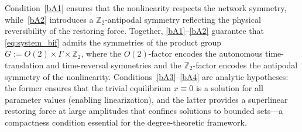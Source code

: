 \documentclass[twoside]{article}%
\def\bz{{\mathbb{Z}}}
\begin{document}
Condition~\ref{bA1} ensures that the nonlinearity respects the network symmetry, while~\ref{bA2} introduces a $\bz_2$-antipodal symmetry reflecting the physical reversibility of the restoring force.
Together, \ref{bA1}--\ref{bA2} guarantee that
\eqref{eq:system_bif} admits the symmetries of the product group $G := O(2) \times \Gamma \times \bz_2$, where the $O(2)$-factor encodes the autonomous time-translation and time-reversal symmetries and the $\bz_2$-factor encodes the antipodal symmetry of the nonlinearity.  Conditions~\ref{bA3}--\ref{bA4} are analytic
hypotheses: the former ensures that the trivial equilibrium $x \equiv 0$ is a solution for all parameter values (enabling linearization),
and the latter provides a superlinear restoring force at large amplitudes that confines solutions to bounded sets---a compactness condition essential for the degree-theoretic framework.
\end{document}
